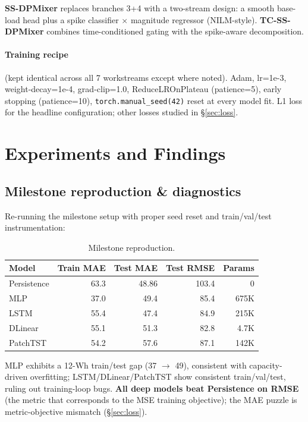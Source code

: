 \documentclass[11pt,letterpaper]{article}
\begin{document}
\textbf{SS-DPMixer} replaces branches 3+4 with a two-stream design: a smooth
base-load head plus a spike classifier $\times$ magnitude regressor
(NILM-style). \textbf{TC-SS-DPMixer} combines time-conditioned gating with
the spike-aware decomposition.

\paragraph{Training recipe} (kept identical across all 7 workstreams except
where noted). Adam, lr=1e-3, weight-decay=1e-4, grad-clip=1.0,
ReduceLROnPlateau (patience=5), early stopping (patience=10),
\texttt{torch.manual\_seed(42)} reset at every model fit. L1 loss for the
headline configuration; other losses studied in \S\ref{sec:loss}.

\section{Experiments and Findings}

\subsection{Milestone reproduction \& diagnostics}

Re-running the milestone setup with proper seed reset and train/val/test
instrumentation:

\begin{table}[H]
\centering
\small
\begin{tabular}{lrrrr}
\toprule
\textbf{Model} & \textbf{Train MAE} & \textbf{Test MAE} & \textbf{Test RMSE} & \textbf{Params} \\
\midrule
Persistence  & 63.3 & 48.86 & 103.4 & 0    \\
MLP          & 37.0 & 49.4  & 85.4  & 675K \\
LSTM         & 55.4 & 47.4  & 84.9  & 215K \\
DLinear      & 55.1 & 51.3  & 82.8  & 4.7K \\
PatchTST     & 54.2 & 57.6  & 87.1  & 142K \\
\bottomrule
\end{tabular}
\caption{Milestone reproduction.}
\end{table}

MLP exhibits a 12-Wh train/test gap (37 $\rightarrow$ 49), consistent with
capacity-driven overfitting; LSTM/DLinear/PatchTST show consistent
train/val/test, ruling out training-loop bugs. \textbf{All deep models beat
Persistence on RMSE} (the metric that corresponds to the MSE training
objective); the MAE puzzle is metric-objective mismatch (\S\ref{sec:loss}).
\end{document}
